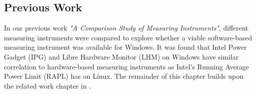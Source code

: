 \subsection{Previous Work}
In our previous work \textit{"A Comparison Study of Measuring Instruments"}\cite{biksbois}, different measuring instruments were compared to explore whether a viable software-based measuring instrument was available for Windows. It was found that Intel Power Gadget (IPG) and Libre Hardware Monitor (LHM) on Windows have similar correlation to hardware-based measuring instruments as Intel's Running Average Power Limit (RAPL) has on Linux. The remainder of this chapter builds upon the related work chapter in \cite{biksbois}.
